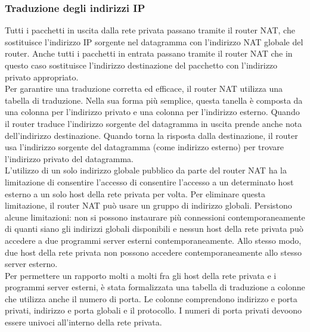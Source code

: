 \documentclass[12pt]{report}
\begin{document}
\subsubsection{Traduzione degli indirizzi IP}
Tutti i pacchetti in uscita dalla rete privata passano tramite il router NAT, che sostituisce l'indirizzo IP sorgente nel datagramma con l'indirizzo NAT globale del router. Anche tutti i pacchetti in entrata passano tramite il router NAT che in questo caso sostituisce l'indirizzo destinazione del pacchetto con l'indirizzo privato appropriato.
\vspace{\baselineskip}\\
Per garantire una traduzione corretta ed efficace, il router NAT utilizza una tabella di traduzione. Nella sua forma più semplice, questa tanella è composta da una colonna per l'indirizzo privato e una colonna per l'indirizzo esterno. Quando il router traduce l'indirizzo sorgente del datagramma in uscita prende anche nota dell'indirizzo destinazione. Quando torna la risposta dalla destinazione, il router usa l'indirizzo sorgente del datagramma (come indirizzo esterno) per trovare l'indirizzo privato del datagramma.
\vspace{\baselineskip}\\
L'utilizzo di un solo indirizzo globale pubblico da parte del router NAT ha la limitazione di consentire l'accesso di consentire l'accesso a un determinato host esterno a un solo host della rete privata per volta. Per eliminare questa limitazione, il router NAT può usare un gruppo di indirizzo globali. Persistono alcune limitazioni: non si possono instaurare più connessioni contemporaneamente di quanti siano gli indirizzi globali disponibili e nessun host della rete privata può accedere a due programmi server esterni contemporaneamente. Allo stesso modo, due host della rete privata non possono accedere contemporaneamente allo stesso server esterno.
\vspace{\baselineskip}\\
Per permettere un rapporto molti a molti fra gli host della rete privata e i programmi server esterni, è stata formalizzata una tabella di traduzione a  colonne che utilizza anche il numero di porta. Le colonne comprendono indirizzo e porta privati, indirizzo e porta globali e il protocollo. I numeri di porta privati devoono essere univoci all'interno della rete privata.
\end{document}
